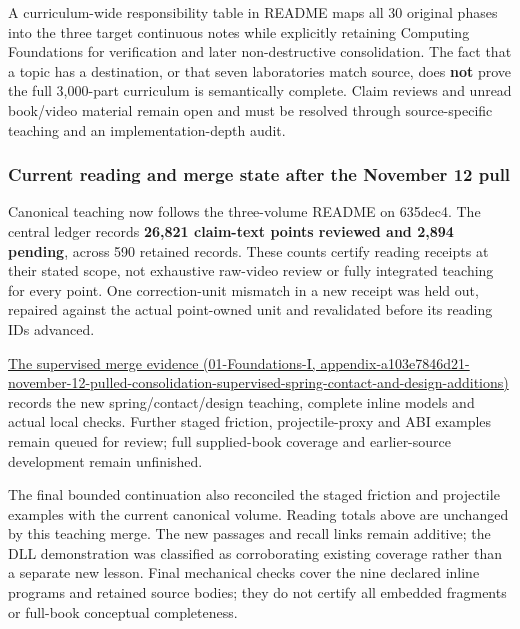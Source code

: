 A curriculum-wide responsibility table in README maps all 30 original phases into the three target continuous notes while explicitly retaining Computing Foundations for verification and later non-destructive consolidation. The fact that a topic has a destination, or that seven laboratories match source, does \textbf{not} prove the full 3,000-part curriculum is semantically complete. Claim reviews and unread book/video material remain open and must be resolved through source-specific teaching and an implementation-depth audit.

\subsubsection{Current reading and merge state after the November 12 pull}\label{appendix-3b67654799a2-current-reading-and-merge-state-after-the-november-12-pull}

Canonical teaching now follows the three-volume README on 635dec4. The central ledger records \textbf{26,821 claim-text points reviewed and 2,894 pending}, across 590 retained records. These counts certify reading receipts at their stated scope, not exhaustive raw-video review or fully integrated teaching for every point. One correction-unit mismatch in a new receipt was held out, repaired against the actual point-owned unit and revalidated before its reading IDs advanced.

\href{../01-Foundations-I/main.pdf\#nameddest=appendix-a103e7846d21-november-12-pulled-consolidation-supervised-spring-contact-and-design-additions}{The supervised merge evidence (01-Foundations-I, appendix-a103e7846d21-november-12-pulled-consolidation-supervised-spring-contact-and-design-additions)} records the new spring/contact/design teaching, complete inline models and actual local checks. Further staged friction, projectile-proxy and ABI examples remain queued for review; full supplied-book coverage and earlier-source development remain unfinished.

The final bounded continuation also reconciled the staged friction and projectile examples with the current canonical volume. Reading totals above are unchanged by this teaching merge. The new passages and recall links remain additive; the DLL demonstration was classified as corroborating existing coverage rather than a separate new lesson. Final mechanical checks cover the nine declared inline programs and retained source bodies; they do not certify all embedded fragments or full-book conceptual completeness.

